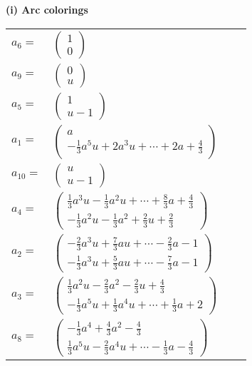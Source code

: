 \documentclass[1p]{elsarticle_modified}
\theoremstyle{definition}
\begin{document}
\flushleft \textbf{(i) Arc colorings}\\
\begin{tabular}{m{7pt} m{180pt} m{7pt} m{180pt} }
\flushright $a_{6}=$&$\begin{pmatrix}1\\0\end{pmatrix}$ \\
\flushright $a_{9}=$&$\begin{pmatrix}0\\u\end{pmatrix}$ \\
\flushright $a_{5}=$&$\begin{pmatrix}1\\u-1\end{pmatrix}$ \\
\flushright $a_{1}=$&$\begin{pmatrix}a\\-\frac{1}{3} a^5 u+2 a^3 u+\cdots+2 a+\frac{4}{3}\end{pmatrix}$ \\
\flushright $a_{10}=$&$\begin{pmatrix}u\\u-1\end{pmatrix}$ \\
\flushright $a_{4}=$&$\begin{pmatrix}\frac{1}{3} a^3 u-\frac{1}{3} a^2 u+\cdots+\frac{8}{3} a+\frac{4}{3}\\-\frac{1}{3} a^2 u-\frac{1}{3} a^2+\frac{2}{3} u+\frac{2}{3}\end{pmatrix}$ \\
\flushright $a_{2}=$&$\begin{pmatrix}-\frac{2}{3} a^3 u+\frac{7}{3} a u+\cdots-\frac{2}{3} a-1\\-\frac{1}{3} a^3 u+\frac{5}{3} a u+\cdots-\frac{7}{3} a-1\end{pmatrix}$ \\
\flushright $a_{3}=$&$\begin{pmatrix}\frac{1}{3} a^2 u-\frac{2}{3} a^2-\frac{2}{3} u+\frac{4}{3}\\-\frac{1}{3} a^5 u+\frac{1}{3} a^4 u+\cdots+\frac{1}{3} a+2\end{pmatrix}$ \\
\flushright $a_{8}=$&$\begin{pmatrix}-\frac{1}{3} a^4+\frac{4}{3} a^2-\frac{4}{3}\\\frac{1}{3} a^5 u-\frac{2}{3} a^4 u+\cdots-\frac{1}{3} a-\frac{4}{3}\end{pmatrix}$ \\

\end{tabular}
\end{document}
